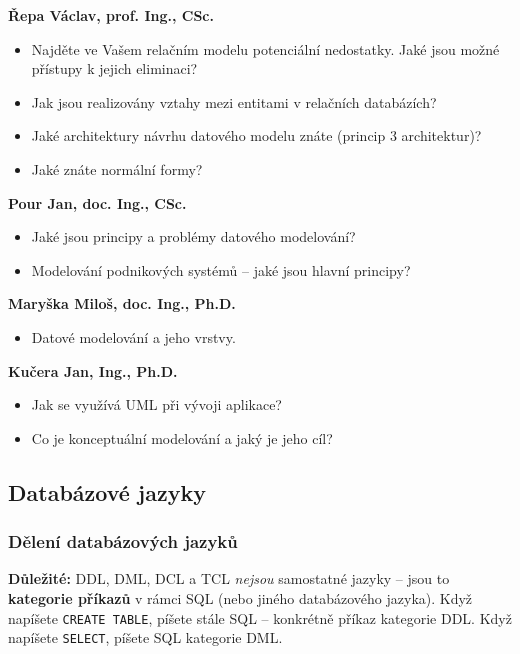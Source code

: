 \begin{profesorbox}
\textbf{Řepa Václav, prof. Ing., CSc.}
\begin{itemize}
  \item Najděte ve Vašem relačním modelu potenciální nedostatky. Jaké jsou možné přístupy k jejich eliminaci?
  \item Jak jsou realizovány vztahy mezi entitami v relačních databázích?
  \item Jaké architektury návrhu datového modelu znáte (princip 3 architektur)?
  \item Jaké znáte normální formy?
\end{itemize}
\textbf{Pour Jan, doc. Ing., CSc.}
\begin{itemize}
  \item Jaké jsou principy a problémy datového modelování?
  \item Modelování podnikových systémů -- jaké jsou hlavní principy?
\end{itemize}
\textbf{Maryška Miloš, doc. Ing., Ph.D.}
\begin{itemize}
  \item Datové modelování a jeho vrstvy.
\end{itemize}
\textbf{Kučera Jan, Ing., Ph.D.}
\begin{itemize}
  \item Jak se využívá UML při vývoji aplikace?
  \item Co je konceptuální modelování a jaký je jeho cíl?
\end{itemize}
\end{profesorbox}

\subsection{Databázové jazyky}

\subsubsection{Dělení databázových jazyků}

\textbf{Důležité:} DDL, DML, DCL a TCL \textit{nejsou} samostatné jazyky -- jsou to
\textbf{kategorie příkazů} v rámci SQL (nebo jiného databázového jazyka).
Když napíšete \texttt{CREATE TABLE}, píšete stále SQL -- konkrétně příkaz kategorie DDL.
Když napíšete \texttt{SELECT}, píšete SQL kategorie DML.


